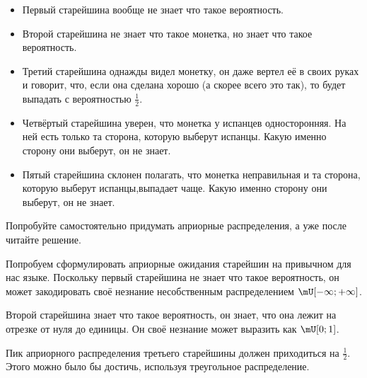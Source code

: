 \begin{itemize}
	\item Первый старейшина вообще не знает что такое вероятность.
	\item Второй старейшина не знает что такое монетка, но знает что такое вероятность. 
	\item Третий старейшина однажды видел монетку, он даже вертел её в своих руках и говорит, что, если она сделана хорошо (а скорее всего это так), то будет выпадать с  вероятностью $\frac{1}{2}$. 
	\item Четвёртый старейшина уверен, что монетка у испанцев односторонняя. На ней есть только та сторона, которую выберут испанцы. Какую именно сторону они выберут, он не знает.
	\item Пятый старейшина склонен полагать, что монетка неправильная и та сторона, которую выберут испанцы,выпадает чаще. Какую именно сторону они выберут, он не знает.
\end{itemize}

Попробуйте самостоятельно придумать априорные распределения, а уже после читайте решение. 

Попробуем сформулировать априорные ожидания старейшин на привычном для нас языке. Поскольку первый старейшина не знает что такое вероятность, он может закодировать своё незнание несобственным распределением $\mU [-\infty; +\infty]$. 

Второй старейшина знает что такое вероятность, он знает, что она лежит на отрезке от нуля до единицы. Он своё незнание может выразить как $\mU [0;1]$.

Пик априорного распределения третьего старейшины должен приходиться на $\frac{1}{2}$. Этого можно было бы достичь, используя треугольное распределение.

